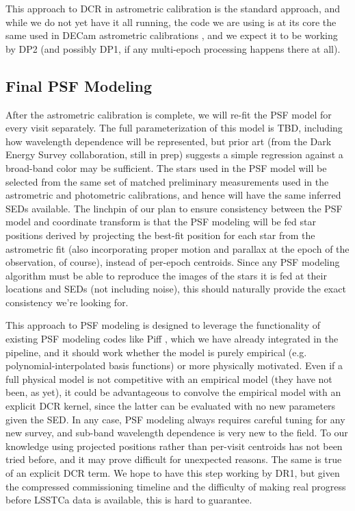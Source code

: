 \documentclass[DM,authoryear,toc]{lsstdoc}
\begin{document}
This approach to DCR in astrometric calibration is the standard approach, and while we do not yet have it all running, the code we are using is at its core the same used in DECam astrometric calibrations \citep{2017PASP..129g4503B}, and we expect it to be working by DP2 (and possibly DP1, if any multi-epoch processing happens there at all).

\subsection{Final PSF Modeling}

After the astrometric calibration is complete, we will re-fit the PSF model for every visit separately.
The full parameterization of this model is TBD, including how wavelength dependence will be represented, but prior art (from the Dark Energy Survey collaboration, still in prep) suggests a simple regression against a broad-band color may be sufficient.
The stars used in the PSF model will be selected from the same set of matched preliminary measurements used in the astrometric and photometric calibrations, and hence will have the same inferred SEDs available.
The linchpin of our plan to ensure consistency between the PSF model and coordinate transform is that the PSF modeling will be fed star positions derived by projecting the best-fit position for each star from the astrometric fit (also incorporating proper motion and parallax at the epoch of the observation, of course), instead of per-epoch centroids.
Since any PSF modeling algorithm must be able to reproduce the images of the stars it is fed at their locations and SEDs (not including noise), this should naturally provide the exact consistency we're looking for.

This approach to PSF modeling is designed to leverage the functionality of existing PSF modeling codes like Piff \citep{2021ascl.soft02024J}, which we have already integrated in the pipeline, and it should work whether the model is purely empirical (e.g. polynomial-interpolated basis functions) or more physically motivated.
Even if a full physical model is not competitive with an empirical model (they have not been, as yet), it could be advantageous to convolve the empirical model with an explicit DCR kernel, since the latter can be evaluated with no new parameters given the SED.
In any case, PSF modeling always requires careful tuning for any new survey, and sub-band wavelength dependence is very new to the field.
To our knowledge using projected positions rather than per-visit centroids has not been tried before, and it may prove difficult for unexpected reasons.
The same is true of an explicit DCR term.
We hope to have this step working by DR1, but given the compressed commissioning timeline and the difficulty of making real progress before LSSTCa data is available, this is hard to guarantee.
\end{document}
